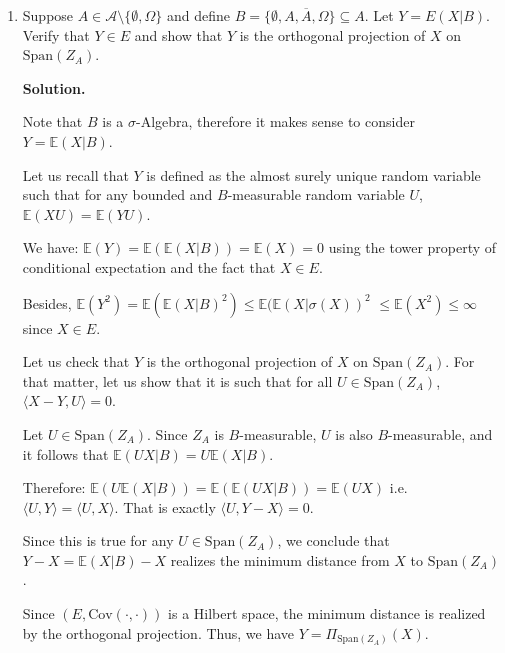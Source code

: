 \documentclass[12pt]{article}
\newcommand{\E}{\mathbb{E}}
\newcommand{\Span}[1]{\text{Span}(#1)}
\newcommand{\Cov}[1]{\text{Cov}(#1)}
\newenvironment{solution}{\vspace{0.2cm} \textbf{Solution.}}{}
\begin{document}
\begin{enumerate}[label=(\alph*)]
\begin{solution}
		Taking the difference between these equations, we obtain the condition: $\lambda = \mu$.
		
		Therefore, $\lambda (Z_A + Z_B) =0$. Since $B \neq \overline{A}$, this implies $\lambda = \mu = 0$.
		
		Thus, $Z_A$ and $Z_B$ are linearly independent.
		
		\end{solution}
		\item Suppose $A \in \mathcal{A} \setminus \{\emptyset, \Omega\}$ and define $B = \{\emptyset, A, \overline{A}, \Omega\} \subseteq A$. Let $Y = E(X|B)$. Verify that $Y \in E$ and show that $Y$ is the orthogonal projection of $X$ on $\Span{Z_A}$.
			 
		\begin{solution}
		
		Note that $B$ is a $\sigma$-Algebra, therefore it makes sense to consider $Y=\E(X|B)$.
		
		Let us recall that $Y$ is defined as the almost surely unique random variable such that for any bounded and $B$-measurable random variable $U$, $\E(XU) = \E(YU)$. 
		
		We have: $\E(Y) = \E(\E(X|B)) = \E(X) = 0$ using the tower property of conditional expectation and the fact that $X \in E$.
		
		Besides, $\E(Y^2) = \E(\E(X|B)^2) \leq \E(\E(X|\sigma(X))^2$ $\leq \E(X^2) \leq \infty$ since $X \in E$.
		
		Let us check that $Y$ is the orthogonal projection of $X$ on $\Span{Z_A}$. For that matter, let us show that it is such that for all $U \in \Span{Z_A}$, $\langle X- Y, U \rangle = 0$.
		
		Let $U \in \Span{Z_A}$. Since $Z_A$ is $B$-measurable, $U$ is also $B$-measurable, and it follows that $\E(UX|B) = U \E(X|B)$.
		
		Therefore: $\E(U \E(X|B)) = \E(\E(UX|B)) = \E(UX)$ i.e.\ $\langle U, Y \rangle = \langle U, X \rangle$. That is exactly $\langle U, Y - X \rangle = 0$.
		
		Since this is true for any $U \in \Span{Z_A}$, we conclude that $Y - X = \E(X|B) - X$ realizes the minimum distance from $X$ to $\Span{Z_A}$.
		
		Since $(E, \Cov{\cdot,\cdot})$ is a Hilbert space, the minimum distance is realized by the orthogonal projection. Thus, we have $Y = \Pi_{\Span{Z_A}}(X)$.
		
		\end{solution}
	\end{enumerate}
\end{document}
